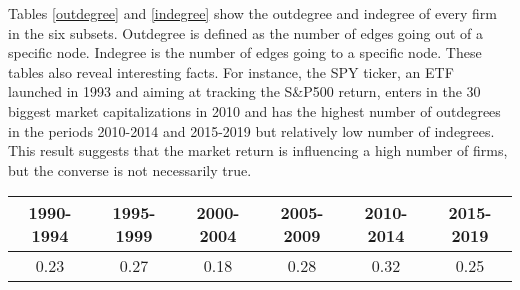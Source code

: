 Tables \ref{outdegree} and \ref{indegree} show the outdegree and indegree of every firm in the six subsets. Outdegree is defined as the number of edges going out of a specific node. Indegree is the number of edges going to a specific node.
These tables also reveal interesting facts. For instance, the SPY ticker, an ETF launched in 1993 and aiming at tracking the S\&P500 return, enters in the 30 biggest market capitalizations in 2010 and has the highest number of outdegrees in the periods 2010-2014 and 2015-2019 but relatively low number of indegrees. This result suggests that the market return is influencing a high number of firms, but the converse is not necessarily true. 


\begin{table}[]
\centering
\begin{tabular}{cccccc}
\hline
\multicolumn{1}{|c|}{1990-1994} &
  \multicolumn{1}{c|}{1995-1999} &
  \multicolumn{1}{c|}{2000-2004} &
  \multicolumn{1}{c|}{2005-2009} &
  \multicolumn{1}{c|}{2010-2014} &
  \multicolumn{1}{c|}{2015-2019} \\ \hline
\multicolumn{1}{|c|}{0.23} &
  \multicolumn{1}{c|}{0.27} &
  \multicolumn{1}{c|}{0.18} &
  \multicolumn{1}{c|}{0.28} &
  \multicolumn{1}{c|}{0.32} &
  \multicolumn{1}{c|}{0.25} \\ \hline

\end{tabular}
\label{GrangerCausality}
\end{table}

    
